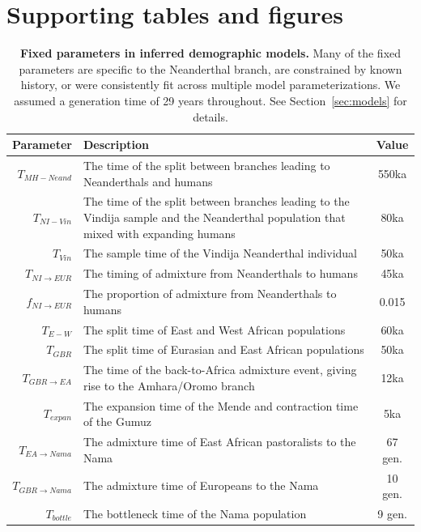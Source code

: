 \documentclass[]{article}
\begin{document}



\clearpage

\section*{Supporting tables and figures}

\begin{table}[ht]
    \caption{
        \label{tab:fixed-params}
        \textbf{Fixed parameters in inferred demographic models.}
        Many of the fixed parameters are specific to the Neanderthal branch, are
        constrained by known history, or were consistently fit across multiple
        model parameterizations. We assumed a generation time of 29 years throughout.
        See Section~\ref{sec:models} for details.
    }
    \centering
    \begin{tabular}[t]{rP{8cm}c}
        \toprule
        Parameter & Description & Value \\
        \midrule
        $T_{MH-Neand}$ & The time of the split between branches leading to Neanderthals and humans & 550ka \\
        $T_{NI-Vin}$ & The time of the split between branches leading to the Vindija sample and the Neanderthal population that mixed with expanding humans & 80ka \\
        $T_{Vin}$ & The sample time of the Vindija Neanderthal individual & 50ka \\
        $T_{NI\rightarrow EUR}$ & The timing of admixture from Neanderthals to humans & 45ka \\
        $f_{NI\rightarrow EUR}$ & The proportion of admixture from Neanderthals to humans & 0.015 \\
        $T_{E-W}$ & The split time of East and West African populations & 60ka \\
        $T_{GBR}$ & The split time of Eurasian and East African populations & 50ka \\
        $T_{GBR\rightarrow EA}$ & The time of the back-to-Africa admixture event, giving rise to the Amhara/Oromo branch & 12ka \\
        $T_{expan}$ & The expansion time of the Mende and contraction time of the Gumuz & 5ka \\
        $T_{EA\rightarrow Nama}$ & The admixture time of East African pastoralists to the Nama & 67 gen. \\
        $T_{GBR\rightarrow Nama}$ & The admixture time of Europeans to the Nama & 10 gen. \\
        $T_{bottle}$ & The bottleneck time of the Nama population & 9 gen. \\
        \bottomrule
    \end{tabular}
\end{table}
\end{document}
